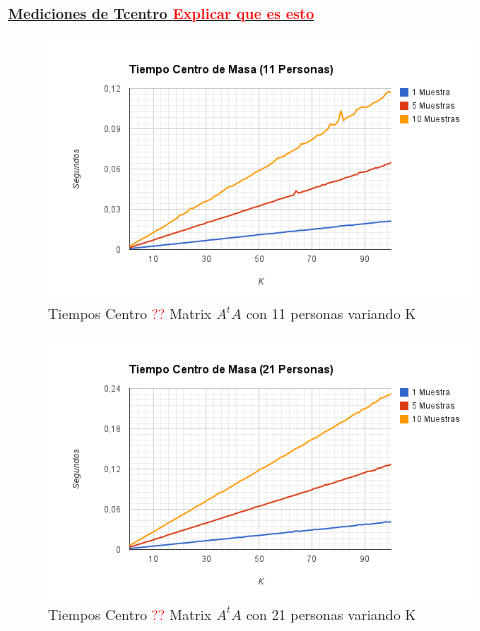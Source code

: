 \underline{\textbf{Mediciones de Tcentro \textcolor{red}{Explicar que es esto}}}

\begin{figure}[H]
\includegraphics[width=1\textwidth]{img/imageg.png}
     \caption{Tiempos Centro \textcolor{red}{??} Matrix $A^tA$ con 11 personas variando K}
     \label{fig:figura1}
\end{figure}

\begin{figure}[H]
\includegraphics[width=1\textwidth]{img/imageh.png}
     \caption{Tiempos Centro \textcolor{red}{??} Matrix $A^tA$ con 21 personas variando K}
     \label{fig:figura1}
\end{figure}

